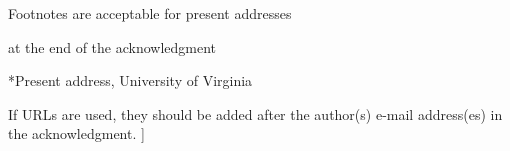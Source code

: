 \documentclass[10pt,letterpaper,twocolumn]{article} %
\begin{document}
\author{Chris Videll}

\address{Department of Electrical Engineering, University of Maryland}

\bigskip

Footnotes are acceptable for present addresses

\author{M. Scott Dineen$*$}



at the end of the acknowledgment


\centerline{*Present address, University of Virginia}

\bigskip

If URLs are used, they should be added after the author(s) e-mail address(es) in the acknowledgment.
]
\end{document}
